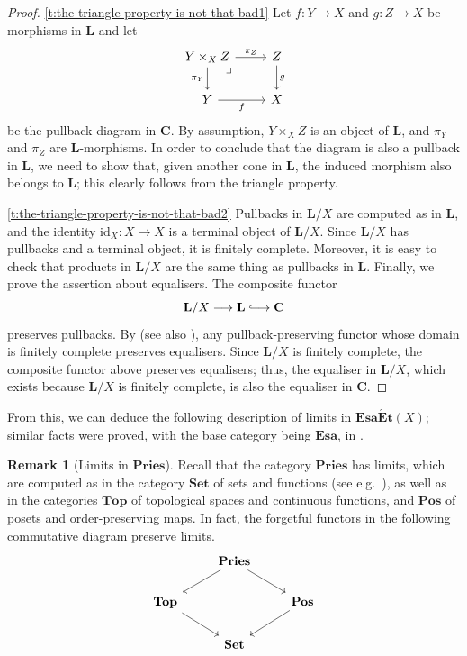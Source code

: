 \documentclass[12pt]{amsart}
\theoremstyle{plain}
\theoremstyle{definition}
\newtheorem{remark}[theorem]{Remark}
\newcommand{\cat}[1]{\mathbf{#1}}
\newcommand{\id}{\mathrm{id}}
\newcommand{\Set}{\cat{Set}}
\newcommand{\Pos}{\cat{Pos}}
\newcommand{\Top}{\cat{Top}}
\newcommand{\Esa}{\cat{Esa}}
\newcommand{\Pries}{\cat{Pries}}
\renewcommand{\L}{\cat{L}}
\newcommand{\EsaEt}{\cat{Esa\acute{E}t}}
\newcommand{\longhookrightarrow}{\lhook\joinrel\longrightarrow}
\begin{document}
\begin{proof}
    \eqref{t:the-triangle-property-is-not-that-bad1}
    Let $f\colon Y\to X$ and $g\colon Z\to X$ be morphisms in $\cat{L}$ and let
    \[
        \begin{tikzcd}
        	{Y\times_X Z}\arrow[dr, phantom, very near start, "\lrcorner"] & Z \\
        	Y & X
        	\arrow["{\pi_Z}", from=1-1, to=1-2]
        	\arrow["{\pi_Y}"', from=1-1, to=2-1]
        	\arrow["g", from=1-2, to=2-2]
        	\arrow["f"', from=2-1, to=2-2]
        \end{tikzcd}
    \]
    be the pullback diagram in $\cat{C}$. By assumption, $Y \times_X Z$ is an object of $\cat{L}$, and $\pi_Y$ and $\pi_Z$ are $\cat{L}$-morphisms. In order to conclude that the diagram is also a pullback in $\cat{L}$, we need to show that, given another cone in $\L$, the induced morphism also belongs to $\L$; this clearly follows from the triangle property.
    
    \eqref{t:the-triangle-property-is-not-that-bad2}
    Pullbacks in $\cat{L}/X$ are computed as in $\cat{L}$, and the identity $\id_X \colon X \to X$ is a terminal object of $\cat{L}/X$.
    Since $\cat{L}/X$ has pullbacks and a terminal object, it is finitely complete.
    Moreover, it is easy to check that products in $\cat{L}/X$ are the same thing as pullbacks in $\cat{L}$. 
    Finally, we prove the assertion about equalisers. The composite functor
    \[
        \cat{L}/X \longrightarrow \cat{L}\longhookrightarrow \cat{C}
    \]
    preserves pullbacks. By
    \cite[Lem.~A.1.2.9]{johnstone2002sketches} (see also
    \cite[p.~742]{Pare1990}), any pullback-preserving functor whose domain is
    finitely complete preserves equalisers. Since $\cat{L}/X$ is finitely
    complete, the composite functor above preserves equalisers; thus, the equaliser in $\cat{L}/X$, which exists because $\cat{L}/X$ is finitely complete, is also the equaliser in $\cat{C}$.
\end{proof}




From this, we can deduce the following description of limits in $\EsaEt(X)$; similar facts were proved, with the base category being $\Esa$, in \cite[Cor.~4.14]{kuznetsovetale}.


\begin{remark}[Limits in $\Pries$] \label{r:limits-in-Pries}
    Recall that the category $\Pries$ has limits, which are computed as in the category $\Set$ of sets and functions (see e.g.\ \cite[p.~69]{Gehrke2024}), as well as in the categories $\Top$ of topological spaces and continuous functions, and $\Pos$ of posets and order-preserving maps.
    In fact, the forgetful functors in the following commutative diagram preserve limits.
    \[
    \begin{tikzcd}
        &\Pries \arrow{rd}{}\arrow{dl}\\
        \Top \arrow{rd}&&\cat{Pos}\arrow{dl}\\
        & \Set
    \end{tikzcd}
    \]
\end{remark}
\end{document}
